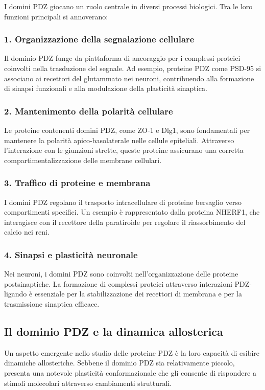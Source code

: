 \documentclass[Lau,binding=0.6cm,oneside,noexaminfo]{sapthesis}
\begin{document}
I domini PDZ giocano un ruolo centrale in diversi processi biologici. Tra le loro funzioni principali si annoverano:

\subsubsection*{1. Organizzazione della segnalazione cellulare}
Il dominio PDZ funge da piattaforma di ancoraggio per i complessi proteici coinvolti nella trasduzione del segnale. Ad esempio, proteine PDZ come PSD-95 si associano ai recettori del glutammato nei neuroni, contribuendo alla formazione di sinapsi funzionali e alla modulazione della plasticità sinaptica.

\subsubsection*{2. Mantenimento della polarità cellulare}
Le proteine contenenti domini PDZ, come ZO-1 e Dlg1, sono fondamentali per mantenere la polarità apico-basolaterale nelle cellule epiteliali. Attraverso l’interazione con le giunzioni strette, queste proteine assicurano una corretta compartimentalizzazione delle membrane cellulari.

\subsubsection*{3. Traffico di proteine e membrana}
I domini PDZ regolano il trasporto intracellulare di proteine bersaglio verso compartimenti specifici. Un esempio è rappresentato dalla proteina NHERF1, che interagisce con il recettore della paratiroide per regolare il riassorbimento del calcio nei reni.

\subsubsection*{4. Sinapsi e plasticità neuronale}
Nei neuroni, i domini PDZ sono coinvolti nell’organizzazione delle proteine postsinaptiche. La formazione di complessi proteici attraverso interazioni PDZ-ligando è essenziale per la stabilizzazione dei recettori di membrana e per la trasmissione sinaptica efficace.

\subsection*{Il dominio PDZ e la dinamica allosterica}

Un aspetto emergente nello studio delle proteine PDZ è la loro capacità di esibire dinamiche allosteriche. Sebbene il dominio PDZ sia relativamente piccolo, presenta una notevole plasticità conformazionale che gli consente di rispondere a stimoli molecolari attraverso cambiamenti strutturali.
\end{document}
